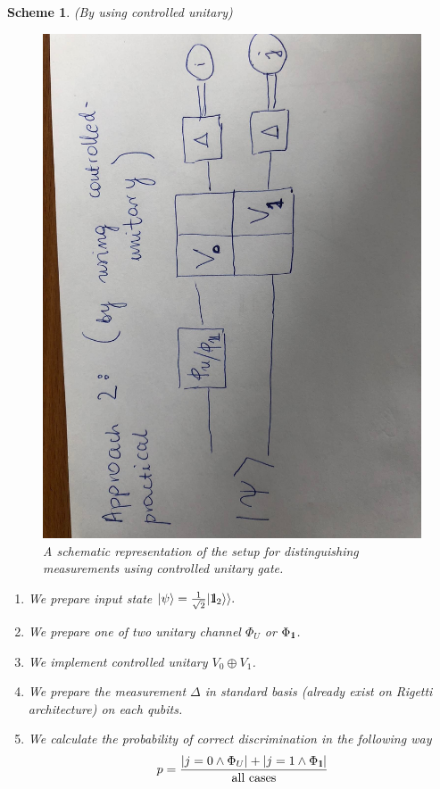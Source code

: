 \documentclass[11pt,a4paper,reqno, oneside]{amsart}
\newcommand{\ket}[1]{\ensuremath{|#1\rangle}}
\newcommand{\1}{{\rm 1\hspace{-0.9mm}l}}
\newcommand{\Id}{{\rm 1\hspace{-0.9mm}l}}
\newtheorem{scheme}{Scheme}
\begin{document}
\newpage
\begin{scheme}(By using controlled unitary)
\begin{figure}[h!]
	\centering 
	\includegraphics[width=0.75\linewidth, angle=-90]{rys-controlled.jpg} 
	
	\caption{ A schematic representation of the setup for distinguishing
		measurements using controlled unitary gate. 
	}\label{fig:controlled}
\end{figure}
\begin{enumerate}
\item We prepare input state $\ket{\psi} = \frac{1}{\sqrt{2} } | \Id_2 \rangle 
\rangle. $
\item We prepare one of two unitary channel $\Phi_{U} $ or $\Phi_{\1}$. 
\item We implement controlled unitary $V_0 \oplus V_1$.
\item We prepare the measurement $\Delta$ in standard basis (already exist on 
Rigetti architecture) on each qubits.
\item We calculate the probability of correct discrimination in the following 
way
\begin{equation}
p = \frac{|j=0 \wedge \Phi_{U} | + |j=1 \wedge \Phi_{\1}|}{\text{all 
cases}}
\end{equation}
\end{enumerate}
\end{scheme}
\end{document}
